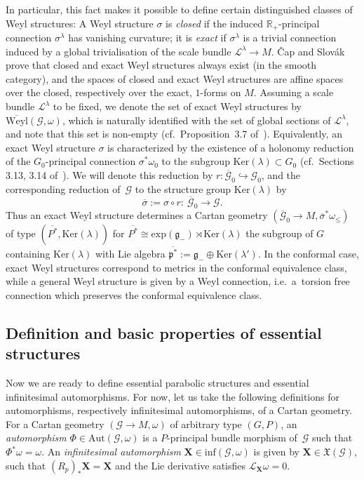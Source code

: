 \documentclass[pdftex]{sigma}
\def\R{\mathbb{R}}
\def\g{\mathfrak{g}}
\def\p{\mathfrak{p}}
\def\Gbdle{\mathcal{G}}
\def\VF{\mathfrak{X}}
\def\dsum{\oplus}
\def\isom{\cong}
\theoremstyle{plain}
\theoremstyle{definition}
\begin{document}
{\sloppy In particular, this fact makes it possible to def\/ine certain distinguished classes of Weyl structures: A Weyl structure $\sigma$ is \emph{closed} if the induced $\R_+$-principal connection $\sigma^{\lambda}$ has vanishing curvature; it is \emph{exact} if $\sigma^{\lambda}$ is a trivial connection induced by a global trivialisation of the scale bundle $\mathcal{L}^{\lambda} \rightarrow M$. \v{C}ap and Slov\'ak prove that closed and exact Weyl structures always exist (in the smooth category), and the spaces of closed and exact Weyl structures are af\/f\/ine spaces over the closed, respectively over the exact, $1$-forms on $M$. Assuming a scale bundle $\mathcal{L}^{\lambda}$ to be f\/ixed, we denote the set of exact Weyl structures by $\overline{\mathrm{Weyl}}(\Gbdle,\omega)$, which is naturally identif\/ied with the set of global sections of $\mathcal{L}^{\lambda}$, and note that this set is non-empty (cf.\ Proposition~3.7 of~\cite{CS03}). Equivalently, an exact Weyl structure $\sigma$ is characterized by the existence of a holonomy reduction of the $G_0$-principal connection $\sigma^*\omega_0$ to the subgroup $\mathrm{Ker}(\lambda) \subset G_0$ (cf.\ Sections 3.13, 3.14 of~\cite{CS03}). We will denote this reduction by $r: \overline{\Gbdle}_0 \hookrightarrow \Gbdle_0$, and the corresponding reduction of~$\Gbdle$ to the structure group $\mathrm{Ker}(\lambda)$ by
\[
\overline{\sigma} := \sigma \circ r: \ \overline{\Gbdle}_0 \rightarrow \Gbdle.
\]
Thus an exact Weyl structure determines a Cartan geometry $(\overline{\Gbdle}_0 \rightarrow M,\overline{\sigma}^*\omega_{\leq})$ of type $(\overline{P^*},\mathrm{Ker}(\lambda))$ for $\overline{P^*} \isom \mathrm{exp}(\g_-) \rtimes \mathrm{Ker}(\lambda)$ the subgroup of $G$ containing $\mathrm{Ker}(\lambda)$ with Lie algebra $\overline{\p^*} := \g_- \dsum \mathrm{Ker}(\lambda')$. In the conformal case, exact Weyl structures correspond to metrics in the conformal equivalence class, while a general Weyl structure is given by a Weyl connection, i.e.\ a~torsion free connection which preserves the conformal equivalence class.

}

\subsection{Def\/inition and basic properties of essential structures}\label{section2.2}

Now we are ready to def\/ine essential parabolic structures and essential inf\/initesimal automorphisms. For now, let us take the following def\/initions for automorphisms, respectively inf\/initesimal automorphisms, of a Cartan geometry. For a Cartan geometry $(\Gbdle \rightarrow M,\omega)$ of arbitrary type $(G,P)$, an \emph{automorphism} $\Phi \in \mathrm{Aut}(\Gbdle,\omega)$ is a $P$-principal bundle morphism of~$\Gbdle$ such that $\Phi^*\omega = \omega$. An \emph{infinitesimal automorphism} $\mathbf{X} \in \mathrm{inf}(\Gbdle,\omega)$ is given by $\mathbf{X} \in \VF(\Gbdle)$, such that $(R_p)_*\mathbf{X} = \mathbf{X}$ and the Lie derivative satisf\/ies $\mathcal{L}_{\mathbf{X}} \omega = 0$.
\end{document}
